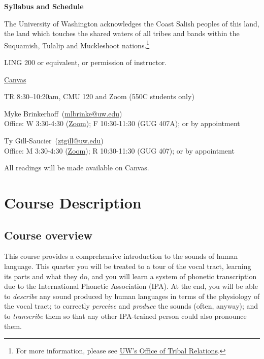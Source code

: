 \documentclass[12pt, letterpaper]{article}
\makeatletter
\newcommand{\InstructorName}{Myke Brinkerhoff}
\newcommand{\InstructorEmail}{mlbrinke@uw.edu}
\newcommand{\InstructorOfficeHours}{W 3:30-4:30 (\href{https://washington.zoom.us/j/96351372694?pwd=QBe9YQv6JczhqbXIqw3bdsRbsKBfG1.1}{Zoom}); F 10:30-11:30 (GUG 407A); or by appointment }
\newcommand{\TAOneName}{Ty Gill-Saucier}
\newcommand{\TAOneEmail}{ztgill@uw.edu}
\newcommand{\TAOneOfficeHours}{M 3:30-4:30 (\href{https://washington.zoom.us/j/94177487053}{Zoom}); R 10:30-11:30 (GUG 407); or by appointment}
\newcommand{\ClassTimeLocation}{TR 8:30--10:20am, CMU 120 and Zoom (550C students only)}
\newcommand{\InstructorInfo}{
    \InstructorName\ (\href{mailto:\InstructorEmail}{\InstructorEmail})\\
        Office: \InstructorOfficeHours
    }
\newcommand{\TAOneInfo}{
    \TAOneName\ (\href{mailto:\TAOneEmail}{\TAOneEmail})\\
    Office: \TAOneOfficeHours
    }
\makeatother
\begin{document}
\begin{center}
    {\Large \textbf{Syllabus and Schedule}} %
\end{center}

\begin{description}[style=multiline, leftmargin=3.5cm,font=\bfseries]
    \item[Land Acknowledgment] The University of Washington acknowledges the Coast Salish peoples of this land, the land which touches the shared waters of all tribes and bands within the Suquamish, Tulalip and Muckleshoot nations.\footnote{For more information, please see \href{https://www.washington.edu/tribalrelations/}{UW's Office of Tribal Relations}.}
    \item[Prerequisites] LING 200 or equivalent, or permission of instructor.
    \item[Course website] \href{https://canvas.uw.edu/courses/1831698}{Canvas}
    \item[Time and Place] \ClassTimeLocation 
    \item[Instructor] \InstructorInfo
    \item[Teaching Assistant] \TAOneInfo
    \item[Required Readings]  All readings will be made available on Canvas.
\end{description}


\section*{Course Description} \label{sec:course_information}

\subsection*{Course overview} \label{sec:content}

This course provides a comprehensive introduction to the sounds of human language. This quarter you will be treated to a tour of the vocal tract, learning its parts and what they do, and you will learn a system of phonetic transcription due to the International Phonetic Association (IPA). At the end, you will be able to \textit{describe} any sound produced by human languages in terms of the physiology of the vocal tract; to correctly \textit{perceive} and \textit{produce} the sounds (often, anyway); and to \textit{transcribe} them so that any other IPA-trained person could also pronounce them. 
\end{document}
